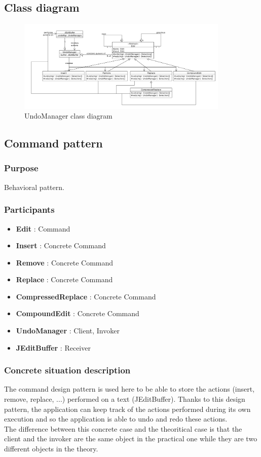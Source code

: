 \documentclass[a4paper,10pt]{article}
\begin{document}
\subsection{Class diagram}
\begin{center}
\begin{figure}[h]
  \centerline{\includegraphics[width=0.9\textwidth]{undomanager-class-diagram.pdf}}
  \caption{UndoManager class diagram}
\end{figure}
\end{center}

\subsection{Command pattern}
\subsubsection{Purpose}
Behavioral pattern.
\subsubsection[Participants]{Participants\footnotemark[1]}
\begin{itemize}
 \item \textbf{Edit} : Command
 \item \textbf{Insert} : Concrete Command
 \item \textbf{Remove} : Concrete Command
 \item \textbf{Replace} : Concrete Command
 \item \textbf{CompressedReplace} : Concrete Command
 \item \textbf{CompoundEdit} : Concrete Command
 \item \textbf{UndoManager} : Client, Invoker
 \item \textbf{JEditBuffer} : Receiver
\end{itemize}

\subsubsection{Concrete situation description}
The command design pattern is used here to be able to store the actions (insert, remove, replace, ...) performed on a text (JEditBuffer). Thanks to this design pattern, the application can keep track of the actions performed during its own execution and so the application is able to undo and redo these actions. \\
The difference between this concrete case and the theoritical case is that the client and the invoker are the same object in the practical one while they are two different objects in the theory.
\end{document}
